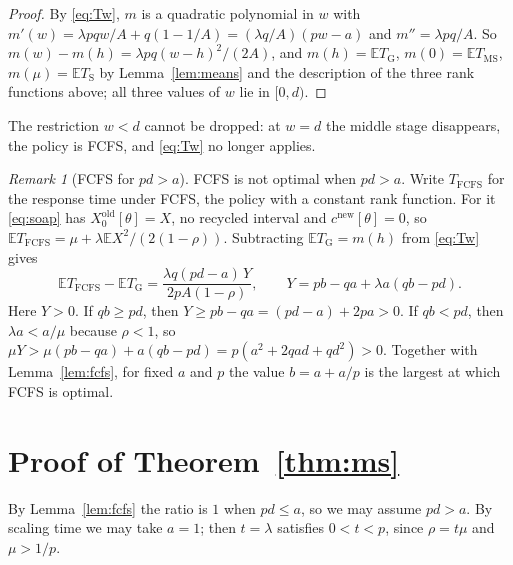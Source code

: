 \documentclass[11pt]{amsart}
\theoremstyle{remark}
\newtheorem{remark}[theorem]{Remark}
\numberwithin{equation}{section}
\newcommand{\E}{\mathbb{E}}
\begin{document}
\begin{proof}
By \eqref{eq:Tw}, $m$ is a quadratic polynomial in $w$ with
$m'(w)=\lambda pqw/A+q(1-1/A)=(\lambda q/A)(pw-a)$ and
$m''=\lambda pq/A$. So $m(w)-m(h)=\lambda pq(w-h)^2/(2A)$, and
$m(h)=\E T_{\mathrm G}$, $m(0)=\E T_{\mathrm{MS}}$, $m(\mu)=\E T_{\mathrm S}$
by Lemma~\ref{lem:means} and the description of the three rank functions
above; all three values of $w$ lie in $[0,d)$.
\end{proof}

The restriction $w<d$ cannot be dropped: at $w=d$ the middle stage
disappears, the policy is FCFS, and \eqref{eq:Tw} no longer applies.

\begin{remark}[FCFS for $pd>a$]\label{rem:fcfs}
FCFS is not optimal when $pd>a$. Write $T_{\mathrm{FCFS}}$ for the response
time under FCFS, the policy with a constant rank function. For it
\eqref{eq:soap} has $X^{\mathrm{old}}_0[\theta]=X$, no recycled interval and
$c^{\mathrm{new}}[\theta]=0$, so
$\E T_{\mathrm{FCFS}}=\mu+\lambda\E X^2/(2(1-\rho))$. Subtracting
$\E T_{\mathrm G}=m(h)$ from \eqref{eq:Tw} gives
\[
\E T_{\mathrm{FCFS}}-\E T_{\mathrm G}=\frac{\lambda q(pd-a)\,Y}{2pA(1-\rho)},
\qquad Y=pb-qa+\lambda a(qb-pd).
\]
Here $Y>0$. If $qb\ge pd$, then $Y\ge pb-qa=(pd-a)+2pa>0$. If $qb<pd$, then
$\lambda a<a/\mu$ because $\rho<1$, so
$\mu Y>\mu(pb-qa)+a(qb-pd)=p(a^2+2qad+qd^2)>0$. Together with
Lemma~\ref{lem:fcfs}, for fixed $a$ and $p$ the value $b=a+a/p$ is the
largest at which FCFS is optimal.
\end{remark}

\section{Proof of Theorem~\ref{thm:ms}}\label{sec:ms}

By Lemma~\ref{lem:fcfs} the ratio is $1$ when $pd\le a$, so we may assume
$pd>a$. By scaling time we may take $a=1$; then $t=\lambda$ satisfies
$0<t<p$, since $\rho=t\mu$ and $\mu>1/p$.
\end{document}
